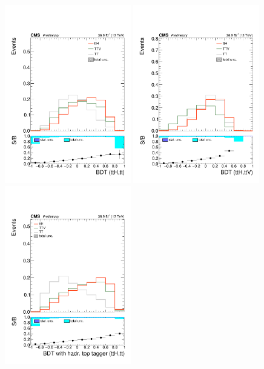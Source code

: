 \begin{figure}[htp]
\centering
\includegraphics[width=0.49\textwidth]{ch9_figs/kinMVA_2lss_ttbar.pdf}
\includegraphics[width=0.49\textwidth]{ch9_figs/kinMVA_2lss_ttV.pdf}\\
\includegraphics[width=0.49\textwidth]{ch9_figs/kinMVA_2lss_ttbar_withBDTv8.pdf}

\end{figure}
